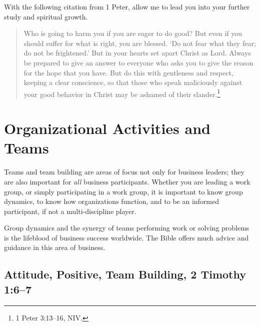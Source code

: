 \documentclass[12pt]{memoir}
\begin{document}
With the following citation from 1 Peter, allow me to lead you into
your further study and spiritual growth. 
\begin{quote}
Who is going to harm you if you are eager to do good? But even if
you should suffer for what is right, you are blessed. `Do not fear
what they fear; do not be frightened.' But in your hearts set apart
Christ as Lord. Always be prepared to give an answer to everyone who
asks you to give the reason for the hope that you have. But do this
with gentleness and respect, keeping a clear conscience, so that those
who speak maliciously against your good behavior in Christ may be
ashamed of their slander.\footnote{1 Peter 3:13--16, NIV.} 
\end{quote}

\mainmatter


\thispagestyle{empty}

\pagestyle{myPageStyle} 

\chapter{Organizational Activities and Teams}

Teams and team building are areas of focus not only for business leaders; they are also important for \emph{all} business participants. Whether you are leading a work group,
or simply participating in a work group, it is important to know group
dynamics, to know how organizations function, and to be an informed
participant, if not a multi-discipline player.

Group dynamics and the synergy of teams performing work or solving
problems is the lifeblood of business success worldwide. The Bible
offers much advice and guidance in this area of business.

\section[Attitude, Positive, Team Building]{Attitude, Positive, Team Building, 2 Timothy 1:6--7}
\end{document}
